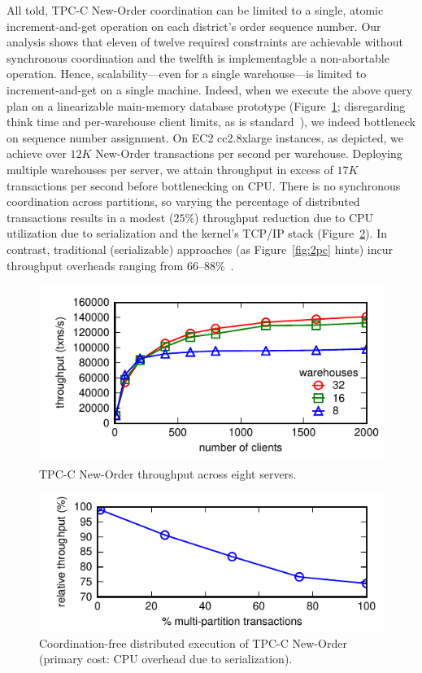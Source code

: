 All told, TPC-C New-Order coordination can be limited to a single,
atomic increment-and-get operation on each district's order sequence
number. Our \cfreedom analysis shows that eleven of twelve required
constraints are achievable without synchronous coordination and the
twelfth is implementagble a non-abortable operation. Hence,
scalability---even for a single warehouse---is limited to
increment-and-get on a single machine. Indeed, when we execute the
above query plan on a linearizable main-memory database prototype
(Figure~\ref{fig:clients}; disregarding think time and per-warehouse
client limits, as is
standard~\cite{calvin,hstore,abadi-vll,jones-dtxn}), we indeed
bottleneck on sequence number assignment. On EC2 cc2.8xlarge
instances, as depicted, we achieve over $12K$ New-Order transactions
per second per warehouse. Deploying multiple warehouses per server, we
attain throughput in excess of $17K$ transactions per second before
bottlenecking on CPU. There is no synchronous coordination across
partitions, so varying the percentage of distributed transactions
results in a modest ($25\%$) throughput reduction due to CPU
utilization due to serialization and the kernel's TCP/IP stack
(Figure~\ref{fig:pct}). In contrast, traditional (serializable)
approaches (as Figure~\ref{fig:2pc} hints) incur throughput overheads
ranging from 66--88\%~\cite{abadi-vll}.

\begin{figure}
\includegraphics[width=\columnwidth]{figs/wh_thru.pdf}\vspace{-1em}
\caption{TPC-C New-Order throughput across eight servers.}
\label{fig:clients}
\end{figure}

\begin{figure}
\includegraphics[width=\columnwidth]{figs/pct_thru.pdf}\vspace{-1em}
\caption{Coordination-free distributed execution of TPC-C New-Order
  (primary cost: CPU overhead due to serialization).}
\label{fig:pct}
\end{figure}

